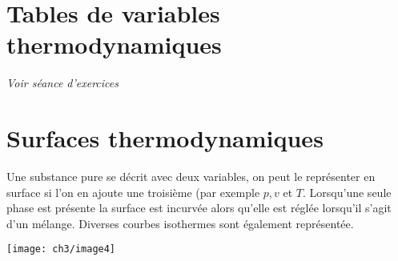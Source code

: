 \section{Tables de variables thermodynamiques}
\textit{Voir séance d'exercices}


\section{Surfaces thermodynamiques}
Une substance pure se décrit avec deux variables, on peut le 
représenter en surface si l'on en ajoute une troisième (par 
exemple $p,v$ et $T$. Lorsqu'une seule phase est présente la 
surface est incurvée alors qu'elle est réglée lorsqu'il s'agit 
d'un mélange. Diverses courbes isothermes sont également 
représentée.

\begin{center}
	\texttt{[image: ch3/image4]}
\end{center}








 




